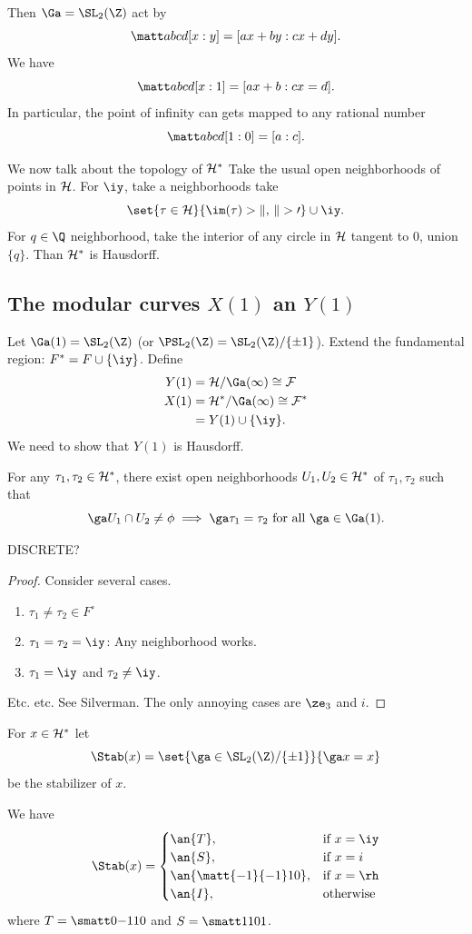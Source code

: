 Then $\Ga=\SL_2(\Z)$ act by
\[
\matt abcd[x:y]=[ax+by:cx+dy].
\]
We have
\[
\matt abcd [x:1]=[ax+b:cx=d].
\]
In particular, the point of infinity can gets mapped to any rational number
\[
\matt abcd [1:0]=[a:c].
\]

We now talk about the topology of $\cal H^*$ Take the usual open neighborhoods of points in $\cal H$. For $\iy$, take a  neighborhoods take
\[
\set{\tau\in \cal H}{\im(\tau)>k,\,k>0}\cup \iy.
\]
For $q\in \Q$ neighborhood, take the interior of any circle in $\cal H$ tangent to 0, union $\{q\}$. Than $\cal H^*$ is Hausdorff.

\subsection{The modular curves $X(1)$ an $Y(1)$}
Let $\Ga(1)=\SL_2(\Z)$ (or $\PSL_2(\Z)=\SL_2(\Z)/\{\pm 1\}$). Extend the fundamental region: $F^*=F\cup \{\iy\}$. Define
\begin{align*}
Y(1)&=\cal H/\Ga(1)\cong F\\
X(1)&=\cal H^*/\Ga(1)\cong F^*\\
&=Y(1)\cup \{\iy\}.
\end{align*}
We need to show that $Y(1)$ is Hausdorff.
\begin{lem}
For any $\tau_1,\tau_2\in \cal H^*$, there exist open neighborhoods $U_1,U_2\in \cal H^*$ of $\tau_1,\tau_2$ such that 
\[
\ga U_1\cap U_2\ne \phi\implies \ga\tau_1=\tau_2\text{ for all }\ga\in \Ga(1).
\]
\end{lem}
DISCRETE?
\begin{proof}
Consider several cases.
\begin{enumerate}
\item
$\tau_1\ne \tau_2\in F^{\circ}$
\item
$\tau_1=\tau_2=\iy$: Any neighborhood works.
\item
$\tau_1=\iy$ and $\tau_2\ne \iy$.
\end{enumerate}
Etc. etc. See Silverman. The only annoying cases are $\ze_3$ and $i$. 
\end{proof}
For $x\in \cal H^*$ let 
\[
\Stab(x)=\set{\ga\in \SL_2(\Z)/\{\pm 1\}}{\ga x=x}
\]%
be the stabilizer of $x$.
\begin{lem}
We have
\[
\Stab(x)=\begin{cases}
\an{T},&\text{if }x=\iy\\
\an{S},&\text{if }x=i\\
\an{\matt{-1}{-1}10},&\text{if }x=\rh\\
\an{I},&\text{otherwise}
\end{cases}
%
%
\]
where $T=\smatt 0{-1}10$ and $S=\smatt 1101$.
\end{lem}
